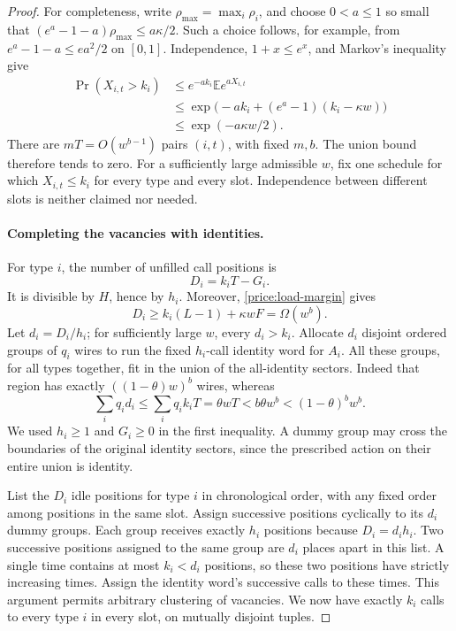\begin{proof}
For completeness, write \(\rho_{\max}=\max_i\rho_i\), and choose
\(0<a\leq1\) so small that
\((e^a-1-a)\rho_{\max}\leq a\kappa/2\).  Such a choice follows,
for example, from \(e^a-1-a\leq ea^2/2\) on \([0,1]\).
Independence, \(1+x\leq e^x\), and Markov's inequality give
\begin{align*}
 \Pr(X_{i,t}>k_i)
 &\leq e^{-ak_i}\mathbb E e^{aX_{i,t}}\\
 &\leq\exp\bigl(-ak_i+(e^a-1)(k_i-\kappa w)\bigr)\\
 &\leq\exp(-a\kappa w/2).
\end{align*}
There are \(mT=O(w^{b-1})\) pairs \((i,t)\), with fixed \(m,b\).
The union bound therefore tends to zero.  For a sufficiently large
admissible \(w\), fix one schedule for which \(X_{i,t}\leq k_i\)
for every type and every slot.  Independence between different slots is
neither claimed nor needed.

\paragraph{Completing the vacancies with identities.}
For type \(i\), the number of unfilled call positions is
\[
 D_i=k_iT-G_i.
\]
It is divisible by \(H\), hence by \(h_i\).  Moreover,
\cref{price:load-margin} gives
\[
 D_i\geq k_i(L-1)+\kappa wF=\Omega(w^b).
\]
Let \(d_i=D_i/h_i\); for sufficiently large \(w\), every \(d_i>k_i\).
Allocate \(d_i\) disjoint ordered groups of \(q_i\) wires to run the
fixed \(h_i\)-call identity word for \(A_i\).  All these groups, for
all types together, fit in the union of the all-identity sectors.  Indeed
that region has exactly \(((1-\theta)w)^b\) wires, whereas
\begin{equation}
 \sum_iq_i d_i
 \leq\sum_iq_i k_iT
 =\theta wT
 <b\theta w^b
 <(1-\theta)^b w^b.
 \label{price:dummy-capacity}
\end{equation}
We used \(h_i\geq1\) and \(G_i\geq0\) in the first inequality.
A dummy group may cross the boundaries of the original identity
sectors, since the prescribed action on their entire union is identity.

List the \(D_i\) idle positions for type \(i\) in chronological order,
with any fixed order among positions in the same slot.  Assign successive
positions cyclically to its \(d_i\) dummy groups.  Each group receives
exactly \(h_i\) positions because \(D_i=d_i h_i\).  Two successive
positions assigned to the same group are \(d_i\) places apart in this
list.  A single time contains at most \(k_i<d_i\) positions, so these
two positions have strictly increasing times.  Assign the identity
word's successive calls to these times.  This argument permits arbitrary
clustering of vacancies.  We now have exactly \(k_i\) calls to every
type \(i\) in every slot, on mutually disjoint tuples.


\end{proof}
